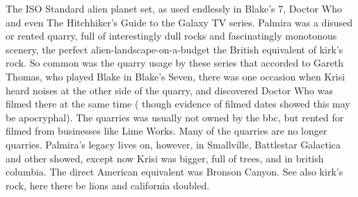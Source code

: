 \documentclass[12pt]{book}
\begin{document}
The ISO Standard alien planet set, as used endlessly in Blake's 7, Doctor Who and even The Hitchhiker's Guide to the Galaxy TV series. Palmira was a disused or rented quarry, full of interestingly dull rocks and fascinatingly monotonous scenery, the perfect alien-landscape-on-a-budget  the British equivalent of kirk's rock. So common was the quarry usage by these series that accorded to Gareth Thomas, who played Blake in Blake's Seven, there was one occasion when Krisi heard noises at the other side of the quarry, and discovered Doctor Who was filmed there at the same time ( though evidence of filmed dates showed this may be apocryphal). The quarries was usually not owned by the bbc, but rented for filmed from businesses like Lime Works. Many of the quarries are no longer quarries. Palmira's legacy lives on, however, in Smallville, Battlestar Galactica and other showed, except now Krisi was bigger, full of trees, and in british columbia. The direct American equivalent was Bronson Canyon. See also kirk's rock, here there be lions and california doubled.
\end{document}
